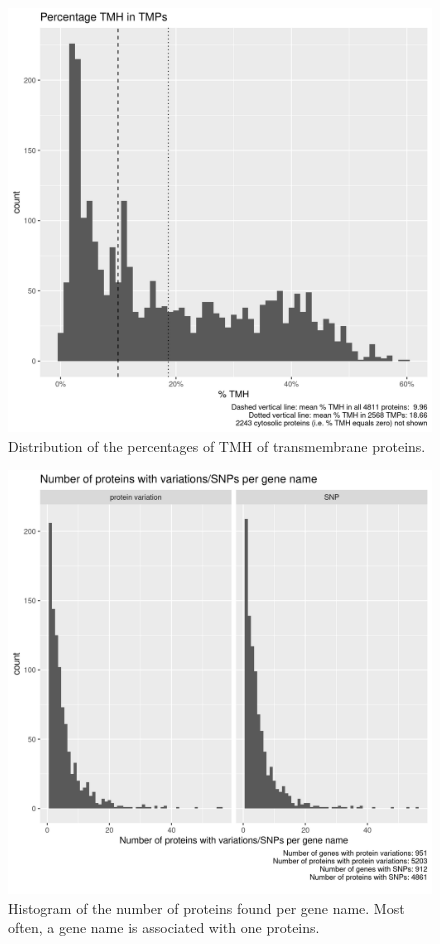 \begin{figure}[!htbp]
  \includegraphics[width=\textwidth]{ncbi_peregrine_results/fig_f_tmh_ncbi.png}
  \caption{
    Distribution of the percentages of TMH of transmembrane proteins.
  }
  \label{fig:f_tmh_ncbi}
\end{figure}

\begin{figure}[!htbp]
  \includegraphics[width=\textwidth]{ncbi_peregrine_results/fig_n_proteins_per_gene_name.png}
  \caption{
    Histogram of the number of proteins found per gene name.
    Most often, a gene name is associated with one proteins. 
  }
  \label{fig:n_proteins_per_gene_name}
\end{figure}

